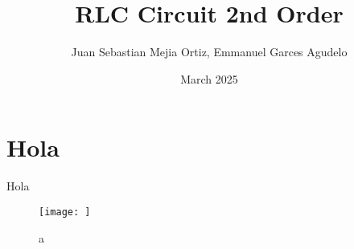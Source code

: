 \documentclass{article}
\title{RLC Circuit 2nd Order}
\author{Juan Sebastian Mejia Ortiz, Emmanuel Garces Agudelo}
\date{March 2025}
\begin{document}
\maketitle

\section{Hola}
Hola

\begin{figure}[h]
    \centering
    \texttt{[image: ]}
    \caption{a}
    \label{fig:a}
\end{figure}
\end{document}
